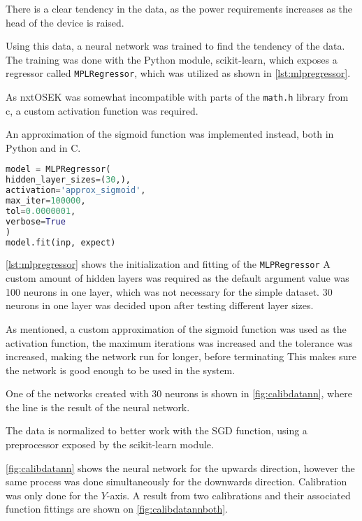 
There is a clear tendency in the data, as the power requirements increases as the head of the device is raised.

Using this data, a neural network was trained to find the tendency of the data.
The training was done with the Python module, scikit-learn\cite{scikit-learn}, which exposes a regressor called \texttt{MPLRegressor}, which was utilized as shown in \autoref{lst:mlpregressor}.


As nxtOSEK was somewhat incompatible with parts of the \texttt{math.h} library from c, a custom activation function was required.

An approximation of the sigmoid function was implemented instead, both in Python and in C.

\begin{lstlisting}[language=python,label={lst:mlpregressor},caption={Training a MLPRegressor with scikit}]
model = MLPRegressor(
hidden_layer_sizes=(30,),
activation='approx_sigmoid',
max_iter=100000,
tol=0.0000001,
verbose=True
)
model.fit(inp, expect)

\end{lstlisting}

\autoref{lst:mlpregressor} shows the initialization and fitting of the \texttt{MLPRegressor} 
A custom amount of hidden layers was required as the default argument value was 100 neurons in one layer, which was not necessary for the simple dataset.
30 neurons in one layer was decided upon after testing different layer sizes.

As mentioned, a custom approximation of the sigmoid function was used as the activation function, the maximum iterations was increased and the tolerance was increased, making the network run for longer, before terminating
This makes sure the network is good enough to be used in the system.

One of the networks created with 30 neurons is shown in \autoref{fig:calibdatann}, where the line is the result of the neural network.

The data is normalized to better work with the SGD function, using a preprocessor exposed by the scikit-learn module.


\autoref{fig:calibdatann} shows the neural network for the upwards direction, however the same process was done simultaneously for the downwards direction.
Calibration was only done for the $Y$-axis.
A result from two calibrations and their associated function fittings are shown on \autoref{fig:calibdatannboth}.

